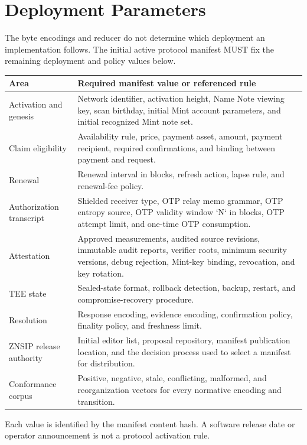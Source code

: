 \section{Deployment Parameters}
\label{sec:completion}

The byte encodings and reducer do not determine which deployment an implementation follows.
The initial active protocol manifest MUST fix the remaining deployment and policy values below.

\begin{center}
\begin{tabularx}{\textwidth}{@{}L{0.28\textwidth}Y@{}}
\toprule
Area & Required manifest value or referenced rule \\
\midrule
Activation and genesis & Network identifier, activation height, Name Note viewing key, scan birthday, initial Mint account parameters, and initial recognized Mint note set. \\
Claim eligibility & Availability rule, price, payment asset, amount, payment recipient, required confirmations, and binding between payment and request. \\
Renewal & Renewal interval  in blocks, refresh action, lapse rule, and renewal-fee policy. \\
Authorization transcript & Shielded receiver type, OTP relay memo grammar, OTP entropy source, OTP validity window `N` in blocks, OTP attempt limit, and one-time OTP consumption. \\
Attestation & Approved measurements, audited source revisions, immutable audit reports, verifier roots, minimum security versions, debug rejection, Mint-key binding, revocation, and key rotation. \\
TEE state & Sealed-state format, rollback detection, backup, restart, and compromise-recovery procedure. \\
Resolution & Response encoding, evidence encoding, confirmation policy, finality policy, and freshness limit. \\
ZNSIP release authority & Initial editor list, proposal repository, manifest publication location, and the decision process used to select a manifest for distribution. \\
Conformance corpus & Positive, negative, stale, conflicting, malformed, and reorganization vectors for every normative encoding and transition. \\
\bottomrule
\end{tabularx}
\end{center}

Each value is identified by the manifest content hash.
A software release date or operator announcement is not a protocol activation rule.
